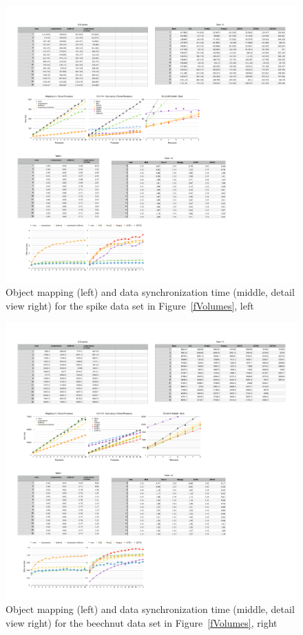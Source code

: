 \documentclass[10pt,journal,compsoc]{IEEEtran}
\newcommand{\fig}[1]{Figure~\ref{#1}}
\begin{document}
\begin{figure}[p!]\center
  \includegraphics[height=.19\textheight]{images/spikesdist}
  \caption{\label{fSpikesDist}Object mapping (left) and data synchronization
    time (middle, detail view right) for the spike data set in
    \fig{fVolumes}, left}
\end{figure}
\begin{figure}[p!]\center
  \includegraphics[height=.19\textheight]{images/beechnutdist}
  \caption{\label{fBeechnutDist}Object mapping (left) and data synchronization
    time (middle, detail view right) for the beechnut data set in
    \fig{fVolumes}, right}
\end{figure}
\end{document}
